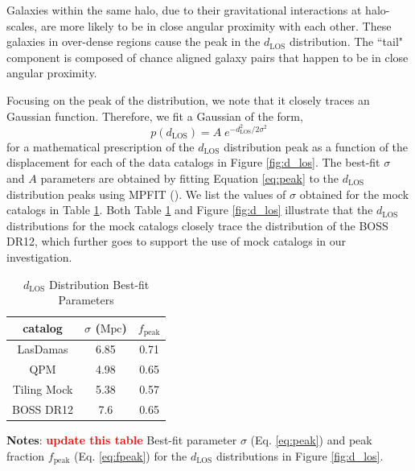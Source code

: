 \documentclass{emulateapj}
\newcommand{\todo}[1]{{\bf \textcolor{red}{ #1}}}
\begin{document}
Galaxies within the same halo, due to their gravitational interactions at halo-scales, are more likely to be in close angular proximity with each other. These galaxies in over-dense regions cause the peak in the $d_{\mathrm{LOS}}$ distribution. The ``tail" component is composed of chance aligned galaxy pairs that happen to be in close angular proximity. 

Focusing on the peak of the distribution, we note that it closely traces an Gaussian function. Therefore, we fit a Gaussian of the form, 
\begin{equation} \label{eq:peak} 
p(d_{\mathrm{LOS}}) = A \; e^{-{d_{\mathrm{LOS}}^2}/{2\sigma^2}}
\end{equation}
 for a mathematical prescription of the $d_{\mathrm{LOS}}$ distribution peak as a function of the displacement for each of the data catalogs in Figure \ref{fig:d_los}. The best-fit $\sigma$ and $A$ parameters are obtained by fitting Equation \ref{eq:peak} to the $d_{\mathrm{LOS}}$ distribution peaks using MPFIT (\citealt{Markwardt:2009aa}). We list the values of $\sigma$ obtained for the mock catalogs in Table \ref{tab:mpfit}. Both Table \ref{tab:mpfit} and Figure \ref{fig:d_los} illustrate that the $d_{\mathrm{LOS}}$ distributions for the mock catalogs closely trace the distribution of the BOSS DR12, which further goes to support the use of mock catalogs in our investigation.  
 
 \begin{table} 
 \caption{$d_{\mathrm{LOS}}$ Distribution Best-fit Parameters} \label{tab:mpfit}
 \begin{spacing}{1.5}
 \begin{center}
 \leavevmode
 \begin{tabular}{ccc} \hline \hline
catalog &$\sigma$ ($\mathrm{Mpc}$) & $f_{\mathrm{peak}}$\\ \hline
LasDamas 	& 6.85	& 0.71 \\ 
QPM 		& 4.98	& 0.65 \\ 
Tiling Mock 	& 5.38	& 0.57 \\ 
BOSS DR12 	& 7.6		& 0.65 \\ \hline
\end{tabular} \par
\end{center}
\end{spacing}
{\bf Notes}: \todo{update this table} Best-fit parameter $\sigma$ (Eq. \ref{eq:peak}) and peak fraction $f_{\mathrm{peak}}$ (Eq. \ref{eq:fpeak}) for the $d_{\mathrm{LOS}}$ distributions in Figure \ref{fig:d_los}. 
\smallskip
\end{table}
\end{document}
